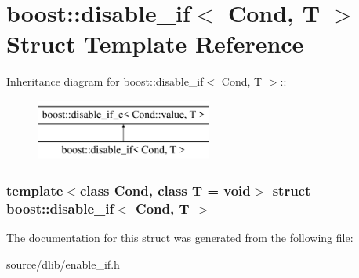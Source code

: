 \hypertarget{structboost_1_1disable__if}{
\section{boost::disable\_\-if$<$ Cond, T $>$ Struct Template Reference}
\label{structboost_1_1disable__if}
}
Inheritance diagram for boost::disable\_\-if$<$ Cond, T $>$::\begin{figure}[H]
\begin{center}
\leavevmode
\includegraphics[height=2cm]{structboost_1_1disable__if}
\end{center}
\end{figure}
\subsubsection*{template$<$class Cond, class T = void$>$ struct boost::disable\_\-if$<$ Cond, T $>$}



The documentation for this struct was generated from the following file:\begin{DoxyCompactItemize}
\item 
source/dlib/enable\_\-if.h\end{DoxyCompactItemize}
